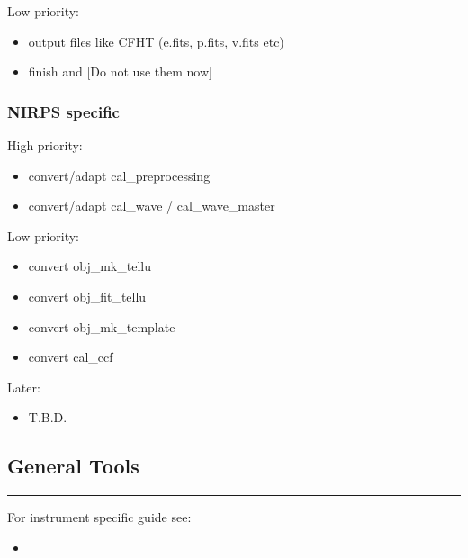 \documentclass[a4paper,10pt,english]{report}
\begin{document}
Low priority:
\begin{itemize}
\item {} 
output files like CFHT (e.fits, p.fits, v.fits etc)

\item {} 
finish  and  {[}Do not use them now{]}

\end{itemize}


\subsubsection{NIRPS specific}
\label{\detokenize{user/general/todo:nirps-specific}}
High priority:
\begin{itemize}
\item {} 
convert/adapt cal\_preprocessing

\item {} 
convert/adapt cal\_wave / cal\_wave\_master

\end{itemize}

Low priority:
\begin{itemize}
\item {} 
convert obj\_mk\_tellu

\item {} 
convert obj\_fit\_tellu

\item {} 
convert obj\_mk\_template

\item {} 
convert cal\_ccf

\end{itemize}

Later:
\begin{itemize}
\item {} 
T.B.D.

\end{itemize}


\subsection{General Tools}
\label{\detokenize{user/general/tools_default:general-tools}}\label{\detokenize{user/general/tools_default:tools-default}}\label{\detokenize{user/general/tools_default::doc}}

\bigskip\hrule\bigskip


For instrument specific guide see:
\begin{itemize}
\item {} 
{\hyperref[\detokenize{user/spirou:spirou-main}]{}}

\end{itemize}
\end{document}
